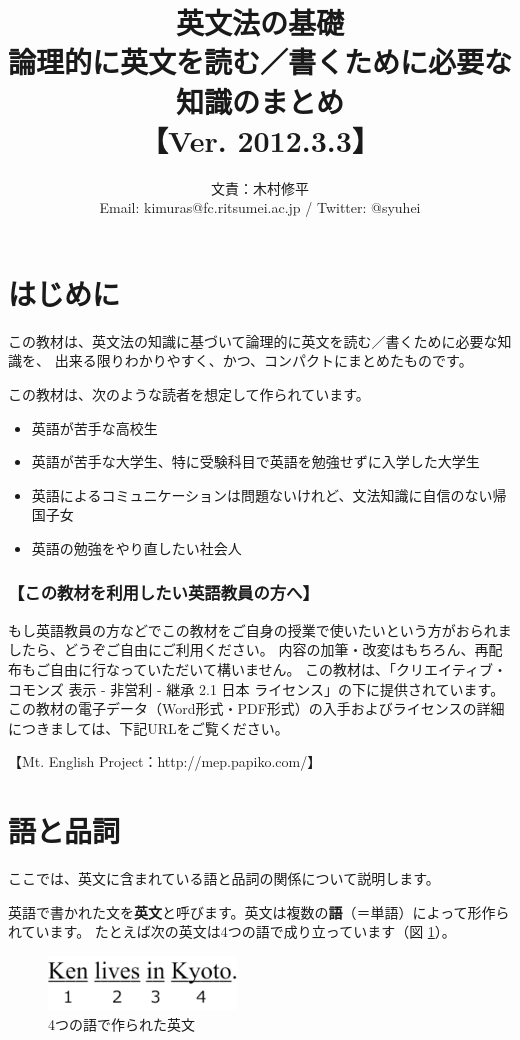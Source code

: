 \documentclass[titlepage]{jsarticle}
\title{英文法の基礎\\ 論理的に英文を読む／書くために必要な知識のまとめ\\【Ver. 2012.3.3】
}  %
\author{文責：木村修平\\Email: kimuras@fc.ritsumei.ac.jp / Twitter: @syuhei}     %
\begin{document}
\maketitle
\tableofcontents

\newpage


\setcounter{section}{-1}
 \section{はじめに}
 この教材は、英文法の知識に基づいて論理的に英文を読む／書くために必要な知識を、
 出来る限りわかりやすく、かつ、コンパクトにまとめたものです。

 この教材は、次のような読者を想定して作られています。
 \begin{itemize}
  \item 英語が苦手な高校生
  \item 英語が苦手な大学生、特に受験科目で英語を勉強せずに入学した大学生
  \item 英語によるコミュニケーションは問題ないけれど、文法知識に自信のない帰国子女
  \item 英語の勉強をやり直したい社会人
 \end{itemize}

   \subsubsection*{【この教材を利用したい英語教員の方へ】}
   もし英語教員の方などでこの教材をご自身の授業で使いたいという方がおられましたら、どうぞご自由にご利用ください。
   内容の加筆・改変はもちろん、再配布もご自由に行なっていただいて構いません。
   この教材は、「クリエイティブ・コモンズ 表示 - 非営利 - 継承 2.1 日本 ライセンス」の下に提供されています。
   この教材の電子データ（Word形式・PDF形式）の入手およびライセンスの詳細につきましては、下記URLをご覧ください。

   【Mt. English Project：http://mep.papiko.com/】


 \section{語と品詞}
 ここでは、英文に含まれている語と品詞の関係について説明します。
 
 英語で書かれた文を{\bf 英文}と呼びます。英文は複数の{\bf 語}（＝単語）によって形作られています。
 たとえば次の英文は4つの語で成り立っています（図 \ref{fig1}）。

 
 \begin{figure}[htbp]
  \begin{center}
   \includegraphics[width=5cm]{./figure/fig1.pdf}
   \caption{4つの語で作られた英文}
   \label{fig1}
  \end{center}
 \end{figure}
 
\end{document}
